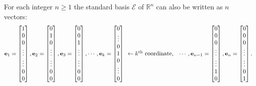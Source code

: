 \begin{remark}For each integer $n\geq 1$ the standard basis $\mathcal{E}$ 
of $\mathbb{R}^n$ can also be written as $n$ vectors:
\[
\vec{e}_{1}=\begin{bmatrix} 1 \\  0 \\ 0 \\ \vdots \\ \vdots \\ 0 \\ 0\end{bmatrix},
\vec{e}_{2}=\begin{bmatrix} 0 \\  1 \\ 0 \\ \vdots \\ \vdots \\ 0 \\ 0\end{bmatrix},
\vec{e}_{3}=\begin{bmatrix} 0 \\  0 \\ 1 \\ \vdots \\ \vdots \\ 0 \\ 0\end{bmatrix},
\cdots,
\vec{e}_k=\begin{bmatrix} 0 \\  \vdots \\ 0 \\ 1 \\ 0 \\ \vdots \\ 0 \end{bmatrix}
\begin{array}{l}
\phantom{0} \\  \phantom{\vdots} \\ \phantom{0} \\ \gets k^{\tiny{\text{th}}} 
\text{ coordinate, } \\ \phantom{0} \\ \phantom{\vdots} \\ \phantom{0} 
\end{array} 
\cdots,
\vec{e}_{n-1}=\begin{bmatrix} 0 \\  0 \\ 0 \\ \vdots \\ \vdots \\ 1 \\ 0\end{bmatrix},
\vec{e}_{n}=\begin{bmatrix} 0 \\  0 \\ 0 \\ \vdots\\ \vdots \\ 0 \\ 
1\end{bmatrix}.
\]
\end{remark}
